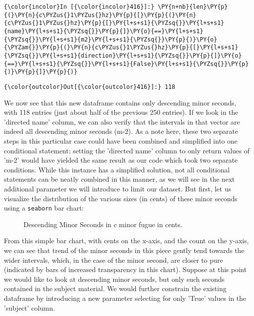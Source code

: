     \begin{Verbatim}[commandchars=\\\{\}]
{\color{incolor}In [{\color{incolor}416}]:} \PY{n+nb}{len}\PY{p}{(}\PY{n}{c\PYZus{}1\PYZus{}hz}\PY{p}{[}\PY{p}{(}\PY{n}{c\PYZus{}1\PYZus{}hz}\PY{p}{[}\PY{l+s+s1}{\PYZsq{}}\PY{l+s+s1}{name}\PY{l+s+s1}{\PYZsq{}}\PY{p}{]}\PY{o}{==}\PY{l+s+s1}{\PYZsq{}}\PY{l+s+s1}{m2}\PY{l+s+s1}{\PYZsq{}}\PY{p}{)}\PY{o}{\PYZam{}}\PY{p}{(}\PY{n}{c\PYZus{}1\PYZus{}hz}\PY{p}{[}\PY{l+s+s1}{\PYZsq{}}\PY{l+s+s1}{direction}\PY{l+s+s1}{\PYZsq{}}\PY{p}{]}\PY{o}{==}\PY{l+s+s1}{\PYZsq{}}\PY{l+s+s1}{False}\PY{l+s+s1}{\PYZsq{}}\PY{p}{)}\PY{p}{]}\PY{p}{)}
\end{Verbatim}
\begin{Verbatim}[commandchars=\\\{\}]
{\color{outcolor}Out[{\color{outcolor}416}]:} 118
\end{Verbatim}
    We now see that this new dataframe contains only descending minor
seconds, with 118 entries (just about half of the previous 250 entries).
If we look in the 'directed name' column, we can also verify that the
intervals in that vector are indeed all descending minor seconds (m-2).
As a note here, these two separate steps in this particular case could
have been combined and simplified into one conditional statement;
setting the 'directed name' column to only return values of 'm-2' would
have yielded the same result as our code which took two separate
conditions. While this instance has a simplified solution, not all
conditional statements can be neatly combined in this manner, as we will
see in the next additional parameter we will introduce to limit our
dataset. But first, let us visualize the distribution of the various
sizes (in cents) of these minor seconds using a \texttt{seaborn} bar
chart:




\begin{figure}[H]
    \begin{center}
    \caption{ Descending Minor Seconds in c minor fugue in cents. }
    \end{center}
\end{figure}
    
    From this simple bar chart, with cents on the x-axis, and the count on
the y-axis, we can see that trend of the minor seconds in this piece
gently tend towards the wider intervals, which, in the case of the minor
second, are closer to pure (indicated by bars of increased transparency
in this chart). Suppose at this point we would like to look at
descending minor seconds, but only such seconds contained in the subject
material. We would further constrain the existing dataframe by
introducing a new parameter selecting for only 'True' values in the
'subject' column.

